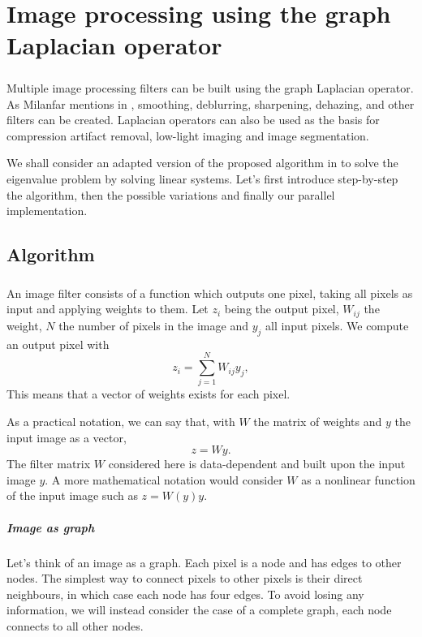 \chapter{Image processing using the graph Laplacian operator}

\paragraph{}
Multiple image processing filters can be built using the graph Laplacian operator.
As Milanfar mentions in \cite{siam_slides_2016} \cite{glide_2014} \cite{talebi_nonlocal_2014}, smoothing, deblurring, sharpening, dehazing, and other filters can be created.
Laplacian operators can also be used as the basis for compression artifact removal, low-light imaging and image segmentation.

We shall consider an adapted version of the proposed algorithm in \cite{glide_2014} to solve the eigenvalue problem by solving linear systems.
Let's first introduce step-by-step the algorithm, then the possible variations and finally our parallel implementation.

\section{Algorithm}

\paragraph{}
An image filter consists of a function which outputs one pixel, taking all pixels as input and applying weights to them.
Let \(z_i\) being the output pixel, \(W_{ij}\) the weight, \(N\) the number of pixels in the image and \(y_j\) all input pixels.
We compute an output pixel with
\[z_i = \sum^{N}_{j=1} W_{ij}y_j,\]
This means that a vector of weights exists for each pixel.

As a practical notation, we can say that, with \(W\) the matrix of weights and \(y\) the input image as a vector,
\[z = Wy.\]
The filter matrix \(W\) considered here is data-dependent and built upon the input image \(y\).
A more mathematical notation would consider \(W\) as a nonlinear function of the input image such as \(z = W(y) y\).

\paragraph{Image as graph}
Let's think of an image as a graph.
Each pixel is a node and has edges to other nodes.
The simplest way to connect pixels to other pixels is their direct neighbours, in which case each node has four edges.
To avoid losing any information, we will instead consider the case of a complete graph, each node connects to all other nodes.

